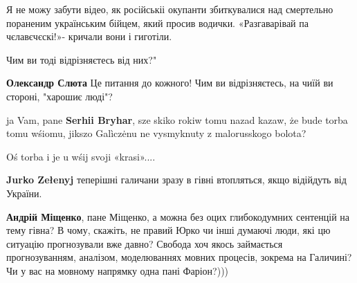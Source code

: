 \begin{itemize}
Я не можу забути відео, як російськіі окупанти збиткувалися над смертельно
пораненим українським бійцем, який просив водички. «Разгаварівай па
чєлавєчєскі!»- кричали вони і гиготіли.

Чим ви тоді відрізняєтесь від них?"

\begin{itemize}
 
\textbf{Олександр Слюта} Це питання до кожного! Чим ви відрізняєтесь, на чиїй ви стороні, "харошиє люді"?
\end{itemize}

 

ja Vam, pane \textbf{Serhii Bryhar}, sze skiko rokiw tomu nazad kazaw, że bude torba
tomu wśiomu, jikszo Galìczėnu ne vysmyknuty z malorusskogo bolota?

Oś torba i je u wśij svoji «krasi»....

\begin{itemize}
 
\textbf{Jurko Zełenyj} теперішні галичани зразу в гівні втопляться, якщо відійдуть від України.

 
\textbf{Андрій Міщенко}, пане Міщенко, а можна без оцих глибокодумних сентенцій
на тему гівна? В чому, скажіть, не правий Юрко чи інші думаючі люди, які цю
ситуацію прогнозували вже давно? Свобода хоч якось займається прогнозуванням,
аналізом, моделюваннях мовних процесів, зокрема на Галичині? Чи у вас на
мовному напрямку одна пані Фаріон?)))
\end{itemize}


\end{itemize}
